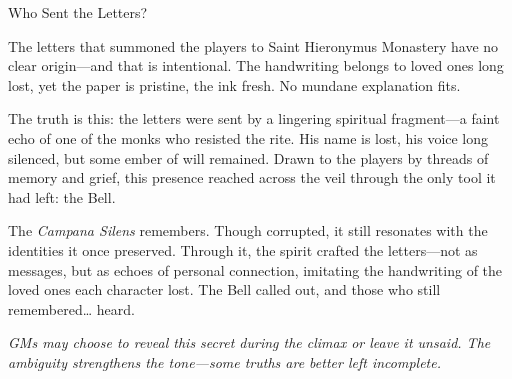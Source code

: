 \begin{CommentBox}{Who Sent the Letters?}\raggedright
    The letters that summoned the players to Saint Hieronymus Monastery have no clear origin—and that is intentional. The handwriting belongs to loved ones long lost, yet the paper is pristine, the ink fresh. No mundane explanation fits.
    
    The truth is this: the letters were sent by a lingering spiritual fragment—a faint echo of one of the monks who resisted the rite. His name is lost, his voice long silenced, but some ember of will remained. Drawn to the players by threads of memory and grief, this presence reached across the veil through the only tool it had left: the Bell.
    
    The \emph{Campana Silens} remembers. Though corrupted, it still resonates with the identities it once preserved. Through it, the spirit crafted the letters—not as messages, but as echoes of personal connection, imitating the handwriting of the loved ones each character lost. The Bell called out, and those who still remembered… heard.
    
    \emph{GMs may choose to reveal this secret during the climax or leave it unsaid. The ambiguity strengthens the tone—some truths are better left incomplete.}
\end{CommentBox}
\newcolumn

